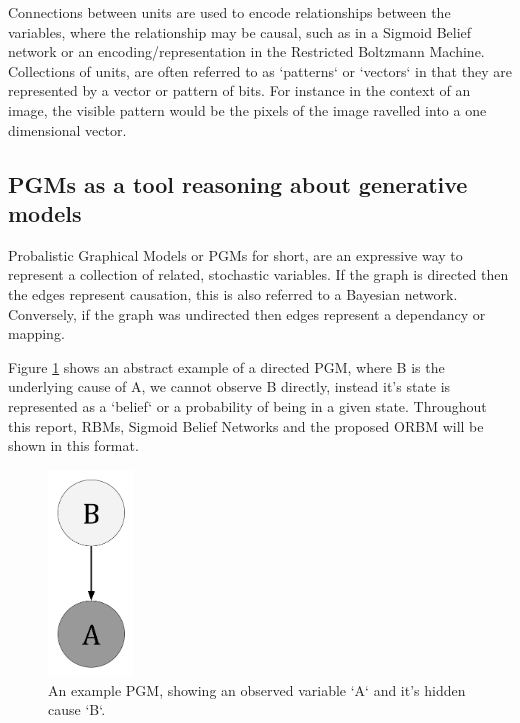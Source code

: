 Connections between units are used to encode relationships between the variables, where the relationship may be causal, such as in a Sigmoid Belief network or an encoding/representation in the Restricted Boltzmann Machine. Collections of units, are often referred to as `patterns` or `vectors` in that they are represented by a vector or pattern of bits. For instance in the context of an image, the visible pattern would be the pixels of the image ravelled into a one dimensional vector.


\subsection{PGMs as a tool reasoning about generative models}

Probalistic Graphical Models or PGMs for short, are an expressive way to represent a collection of related, stochastic variables. If the graph is directed then the edges represent causation, this is also referred to a Bayesian network. Conversely, if the graph was undirected then edges represent a dependancy or mapping.

Figure \ref{F:PGM-example} shows an abstract example of a directed PGM, where B is the underlying cause of A, we cannot observe B directly, instead it's state is represented as a `belief` or a probability of being in a given state. Throughout this report, RBMs, Sigmoid Belief Networks and the proposed ORBM will be shown in this format.

\begin{figure}
\begin{center}
  \includegraphics[width = 0.2\textwidth]{Assets/PGM_Example_1.png}
\caption{An example PGM, showing an observed variable `A` and it's hidden cause `B`.}
\label{F:PGM-example}
\end{center}
\end{figure}


